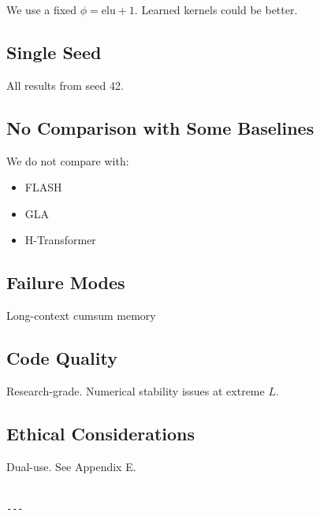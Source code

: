 We use a fixed $\phi = \mathrm{elu} + 1$. Learned kernels could be better.

\subsection{Single Seed}

All results from seed 42.

\subsection{No Comparison with Some Baselines}

We do not compare with:
\begin{itemize}
\item FLASH
\item GLA
\item H-Transformer

\end{itemize}
\subsection{Failure Modes}

Long-context cumsum memory

\subsection{Code Quality}

Research-grade. Numerical stability issues at extreme $L$.

\subsection{Ethical Considerations}

Dual-use. See Appendix E.
\begin{lstlisting}

---
\end{lstlisting}